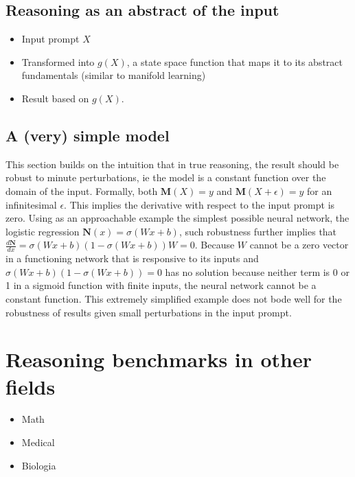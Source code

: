 \documentclass[
]{article}
\begin{document}
\subsection{Reasoning as an abstract of the
input}\label{reasoning-as-an-abstract-of-the-input}

\begin{itemize}
\item
  Input prompt \(X\)
\item
  Transformed into \(g(X)\), a state space function that maps it to its
  abstract fundamentals (similar to manifold learning)
\item
  Result based on \(g(X)\).
\end{itemize}

\subsection{A (very) simple model}\label{a-very-simple-model}

This section builds on the intuition that in true reasoning, the result
should be robust to minute perturbations, ie the model is a constant
function over the domain of the input. Formally, both
\(\mathbf{M}(X) = y\) and \(\mathbf{M}(X + \epsilon) = y\) for an
infinitesimal \(\epsilon\). This implies the derivative with respect to
the input prompt is zero. Using as an approachable example the simplest
possible neural network, the logistic regression
\(\mathbf{N}(x) = \sigma(Wx + b)\), such robustness further implies that
\(\frac{d\mathbf{N}}{d x} = \sigma(Wx + b)(1-\sigma(Wx + b))W = 0\).
Because \(W\) cannot be a zero vector in a functioning network that is
responsive to its inputs and \(\sigma(Wx + b)(1-\sigma(Wx + b)) = 0\)
has no solution because neither term is 0 or 1 in a sigmoid function
with finite inputs, the neural network cannot be a constant function.
This extremely simplified example does not bode well for the robustness
of results given small perturbations in the input prompt.

\section{Reasoning benchmarks in other
fields}\label{reasoning-benchmarks-in-other-fields}

\begin{itemize}
\item
  Math
\item
  Medical
\item
  Biologia
\end{itemize}
\end{document}
